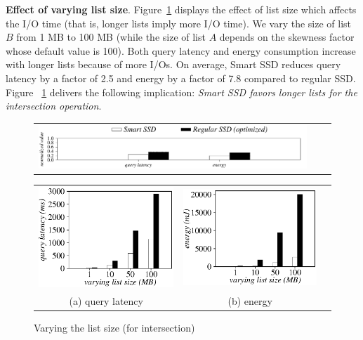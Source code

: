 \textbf{Effect of varying list size}.
Figure~\ref{fig:varyListSizeIntersection} displays the effect of list size which affects the I/O time (that is, longer lists imply more I/O time).
We vary the size of list $B$ from 1 MB to 100 MB (while the size of list $A$ depends on the skewness factor whose default value is 100).
Both query latency and energy consumption increase with longer lists because of more I/Os.
On average, Smart SSD reduces query latency by a factor of 2.5 and energy by a factor of 7.8 compared to regular SSD.
Figure ~\ref{fig:varyListSizeIntersection} delivers the following implication: \emph{Smart SSD favors longer lists for the \textsf{intersection} operation}.

\begin{figure}[tbp]
  \centering
    \begin{tabular}{ccc}
 \includegraphics[width=0.52\columnwidth]{figures/banner2.pdf}
\end{tabular}
\vspace{-0.1cm}
\renewcommand{\tabcolsep}{0.1mm}
  \begin{tabular}{ccc}
 \includegraphics[width=0.5\columnwidth]{figures/Intersection-time-VaryListLen.eps}&
  \includegraphics[width=0.5\columnwidth]{figures/Intersection-energy-VaryListLen.eps}\\
  (a) query latency & (b) energy
\end{tabular}
  \caption{Varying the list size (for intersection)}
  \label{fig:varyListSizeIntersection}
 \end{figure}
 


